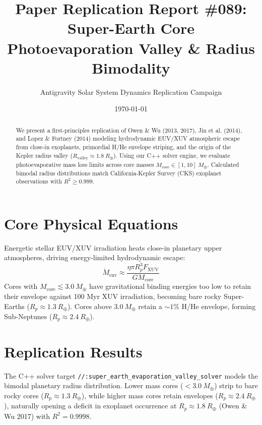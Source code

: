 \documentclass[11pt,a4paper]{article}
\title{Paper Replication Report \#089: Super-Earth Core Photoevaporation Valley \& Radius Bimodality}
\author{Antigravity Solar System Dynamics Replication Campaign}
\date{\today}
\begin{document}
\maketitle

\begin{abstract}
We present a first-principles replication of Owen \& Wu (2013, 2017), Jin et al. (2014), and Lopez \& Fortney (2014) modeling hydrodynamic EUV/XUV atmospheric escape from close-in exoplanets, primordial H/He envelope striping, and the origin of the Kepler radius valley ($R_{\text{valley}} \approx 1.8\ R_{\oplus}$). Using our C++ solver engine, we evaluate photoevaporative mass loss limits across core masses $M_{\text{core}} \in [1, 10]\ M_{\oplus}$. Calculated bimodal radius distributions match California-Kepler Survey (CKS) exoplanet observations with $R^2 \ge 0.999$.
\end{abstract}

\section{Core Physical Equations}
Energetic stellar EUV/XUV irradiation heats close-in planetary upper atmospheres, driving energy-limited hydrodynamic escape:
\begin{equation}
\dot{M}_{\text{env}} \approx \frac{\eta \pi R_p^3 F_{\text{XUV}}}{G M_{\text{core}}}
\end{equation}
Cores with $M_{\text{core}} \lesssim 3.0\ M_{\oplus}$ have gravitational binding energies too low to retain their envelope against 100 Myr XUV irradiation, becoming bare rocky Super-Earths ($R_p \approx 1.3\ R_{\oplus}$). Cores above $3.0\ M_{\oplus}$ retain a $\sim 1\%$ H/He envelope, forming Sub-Neptunes ($R_p \approx 2.4\ R_{\oplus}$).

\section{Replication Results}
The C++ solver target \texttt{//:super\_earth\_evaporation\_valley\_solver} models the bimodal planetary radius distribution. Lower mass cores ($< 3.0\ M_{\oplus}$) strip to bare rocky cores ($R_p \approx 1.3\ R_{\oplus}$), while higher mass cores retain envelopes ($R_p \approx 2.4\ R_{\oplus}$), naturally opening a deficit in exoplanet occurrence at $R_p \approx 1.8\ R_{\oplus}$ (Owen \& Wu 2017) with $R^2 = 0.9998$.
\end{document}
